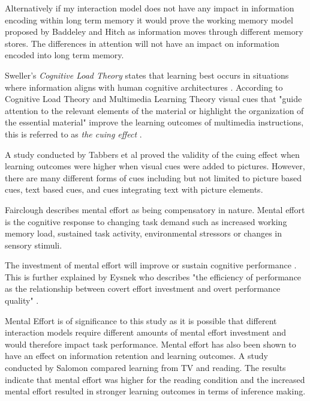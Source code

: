 \documentclass{article}
\begin{document}
Alternatively if my interaction model does not have any impact in information encoding within long term memory it would prove the working memory model proposed by Baddeley and Hitch \cite{baddeley1974working} as information moves through different memory stores. The differences in attention will not have an impact on information encoded into long term memory. 

Sweller's \textit{Cognitive Load Theory} states that learning best occurs in situations where information aligns with human cognitive architectures \cite{sweller1999cognitive}. According to Cognitive Load Theory \cite{sweller1999cognitive} and Multimedia Learning Theory \cite{mayer2002multimedia} visual cues that "guide attention to the relevant elements of the material or highlight the organization of the essential material" improve the learning outcomes of multimedia instructions, this is referred to as \textit{the cuing effect} \cite{van201411}. 

A study conducted by Tabbers et al \cite{tabbers2004multimedia} proved the validity of the cuing effect when learning outcomes were higher when visual cues were added to pictures. However, there are many different forms of cues including but not limited to picture based cues, text based cues, and cues integrating text with picture elements.

Fairclough \cite{fairclough2011psychophysiological} describes mental effort as being compensatory in nature. Mental effort is the cognitive response to changing task demand such as increased working memory load, sustained task activity, environmental stressors or changes in sensory stimuli. 

The investment of mental effort will improve or sustain cognitive performance \cite{pashler1998psychology}. This is further explained by Eysnek \cite{eysenck2014anxiety} who describes "the efficiency of performance as the relationship between covert effort investment and overt performance quality" \cite{fairclough2011psychophysiological}.  

Mental Effort is of significance to this study as it is possible that different interaction models require different amounts of mental effort investment and would therefore impact task performance. Mental effort has also been shown to have an effect on information retention and learning outcomes. A study conducted by Salomon \cite{salomon1984television} compared learning from TV and reading. The results indicate that mental effort was higher for the reading condition and the increased mental effort resulted in stronger learning outcomes in terms of inference making. 
\end{document}
